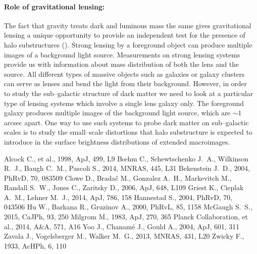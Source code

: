 \documentclass[paper=a4, fontsize=11pt]{scrartcl} %
\numberwithin{equation}{section} %
\numberwithin{figure}{section} %
\numberwithin{table}{section} %
\begin{document}
\paragraph{Role of gravitational lensing:}
The fact that gravity treats dark and luminous mass the same gives gravitational lensing a unique opportunity to provide an independent test for the presence of halo substructures (\cite{Zackrisson09}). Strong lensing by a foreground object can produce multiple images of a background light source. Measurements on strong lensing systems provide us with information about mass distribution of both the lens and the source. All different types of massive objects such as galaxies or galaxy clusters can serve as lenses and bend the light from their background. However, in order to study the sub--galactic structure of dark matter we need to look at a particular type of lensing systems which involve a single lens galaxy only. The foreground galaxy produces multiple images of the background light source, which are $\sim1$ arcsec apart. One way to use such systems to probe dark matter on sub--galactic scales is to study the small--scale distortions that halo substructure is expected to introduce in the surface brightness distributions of extended macroimages. 


\newpage
\begin{thebibliography}{}
Alcock C., et al., 1998, ApJ, 499, L9 
 B{\oe}hm C., Schewtschenko J.~A., 
Wilkinson R.~J., Baugh C.~M., Pascoli S., 2014, MNRAS, 445, L31 
Bekenstein J.~D., 2004, PhRvD, 70, 083509 
Clowe D., Brada{\v c} M., Gonzalez A.~H., Markevitch M., Randall S.~W., 
Jones C., Zaritsky D., 2006, ApJ, 648, L109 
 Griest K., Cieplak A.~M., Lehner M.~J., 2014, ApJ, 786, 158 
Hannestad S., 2004, PhRvD, 70, 043506 
 Hu W., Barkana R., Gruzinov A., 2000, PhRvL, 85, 1158 
McGaugh S.~S., 2015, CaJPh, 93, 250 
Milgrom M., 1983, ApJ, 270, 365 
 Planck Collaboration, et al., 2014, A\&A, 571, A16 
 Yoo J., Chanam{\'e} J., Gould A., 2004, ApJ, 601, 311 
 Zavala J., Vogelsberger M., Walker M.~G., 2013, MNRAS, 431, L20 
 Zwicky 
F., 1933, AcHPh, 6, 110 
\end{thebibliography}
\end{document}
